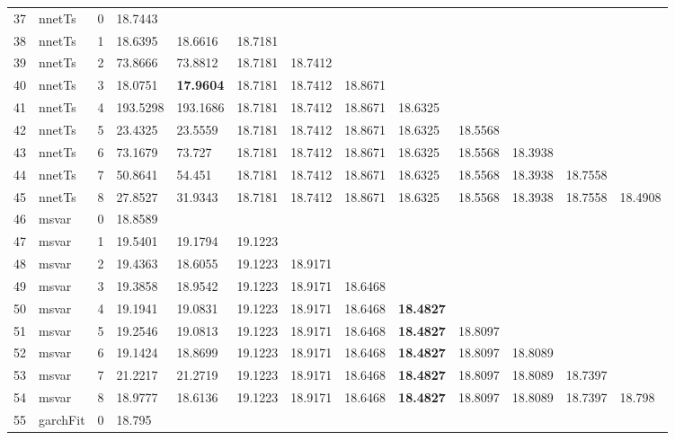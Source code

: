 \documentclass[10pt,a4paper]{article}
\begin{document}
\begin{table}[ht]
\begin{tabular}{rlrllllllllll}
   \hline
37 & nnetTs &     0 & 18.7443 &  &  &  &  &  &  &  &  &  \\ 
  38 & nnetTs &     1 & 18.6395 & 18.6616 & 18.7181 &  &  &  &  &  &  &  \\ 
  39 & nnetTs &     2 & 73.8666 & 73.8812 & 18.7181 & 18.7412 &  &  &  &  &  &  \\ 
  40 & nnetTs &     3 & 18.0751 & \textbf{17.9604} & 18.7181 & 18.7412 & 18.8671 &  &  &  &  &  \\ 
  41 & nnetTs &     4 & 193.5298 & 193.1686 & 18.7181 & 18.7412 & 18.8671 & 18.6325 &  &  &  &  \\ 
  42 & nnetTs &     5 & 23.4325 & 23.5559 & 18.7181 & 18.7412 & 18.8671 & 18.6325 & 18.5568 &  &  &  \\ 
  43 & nnetTs &     6 & 73.1679 & 73.727 & 18.7181 & 18.7412 & 18.8671 & 18.6325 & 18.5568 & 18.3938 &  &  \\ 
  44 & nnetTs &     7 & 50.8641 & 54.451 & 18.7181 & 18.7412 & 18.8671 & 18.6325 & 18.5568 & 18.3938 & 18.7558 &  \\ 
  45 & nnetTs &     8 & 27.8527 & 31.9343 & 18.7181 & 18.7412 & 18.8671 & 18.6325 & 18.5568 & 18.3938 & 18.7558 & 18.4908 \\ 
   \hline
46 & msvar &     0 & 18.8589 &  &  &  &  &  &  &  &  &  \\ 
  47 & msvar &     1 & 19.5401 & 19.1794 & 19.1223 &  &  &  &  &  &  &  \\ 
  48 & msvar &     2 & 19.4363 & 18.6055 & 19.1223 & 18.9171 &  &  &  &  &  &  \\ 
  49 & msvar &     3 & 19.3858 & 18.9542 & 19.1223 & 18.9171 & 18.6468 &  &  &  &  &  \\ 
  50 & msvar &     4 & 19.1941 & 19.0831 & 19.1223 & 18.9171 & 18.6468 & \textbf{18.4827} &  &  &  &  \\ 
  51 & msvar &     5 & 19.2546 & 19.0813 & 19.1223 & 18.9171 & 18.6468 & \textbf{18.4827} & 18.8097 &  &  &  \\ 
  52 & msvar &     6 & 19.1424 & 18.8699 & 19.1223 & 18.9171 & 18.6468 & \textbf{18.4827} & 18.8097 & 18.8089 &  &  \\ 
  53 & msvar &     7 & 21.2217 & 21.2719 & 19.1223 & 18.9171 & 18.6468 & \textbf{18.4827} & 18.8097 & 18.8089 & 18.7397 &  \\ 
  54 & msvar &     8 & 18.9777 & 18.6136 & 19.1223 & 18.9171 & 18.6468 & \textbf{18.4827} & 18.8097 & 18.8089 & 18.7397 & 18.798 \\ 
   \hline
55 & garchFit &     0 & 18.795 &  &  &  &  &  &  &  &  &  \\ 

\end{tabular}
\end{table}
\end{document}
